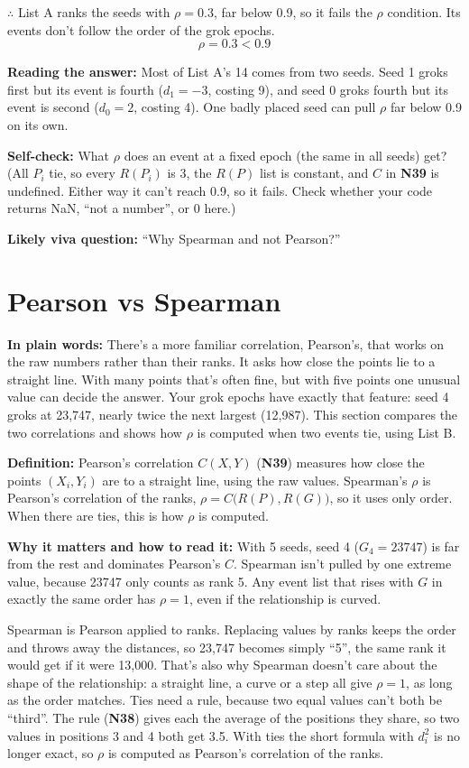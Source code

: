 \documentclass[11pt,a4paper,oneside,openany]{report}
\newcommand{\gl}[1]{\textbf{#1}}   %
\newcommand{\fplain}{\textbf{In plain words:} }
\newcommand{\fdef}{\textbf{Definition:} }
\newcommand{\fread}{\par\textbf{Why it matters and how to read it:} }
\newcommand{\fans}{\par\textbf{Reading the answer:} }
\newcommand{\fself}{\par\textbf{Self-check:} }
\newcommand{\fviva}{\par\textbf{Likely viva question:} }
\begin{document}
$\therefore$ List A ranks the seeds with $\rho = 0.3$, far below 0.9, so it fails the $\rho$ condition. Its events don't follow the order of the grok epochs.
\[\boxed{\rho = 0.3 < 0.9}\]

\fans Most of List A's 14 comes from two seeds. Seed 1 groks first but its event is fourth ($d_1 = -3$, costing 9), and seed 0 groks fourth but its event is second ($d_0 = 2$, costing 4). One badly placed seed can pull $\rho$ far below 0.9 on its own.

\fself What $\rho$ does an event at a fixed epoch (the same in all seeds) get? (All $P_i$ tie, so every $R(P_i)$ is 3, the $R(P)$ list is constant, and $C$ in \gl{N39} is undefined. Either way it can't reach 0.9, so it fails. Check whether your code returns NaN, ``not a number'', or 0 here.)
\fviva ``Why Spearman and not Pearson?''

\section{Pearson vs Spearman}
\fplain There's a more familiar correlation, Pearson's, that works on the raw numbers rather than their ranks. It asks how close the points lie to a straight line. With many points that's often fine, but with five points one unusual value can decide the answer. Your grok epochs have exactly that feature: seed 4 groks at 23{,}747, nearly twice the next largest (12{,}987). This section compares the two correlations and shows how $\rho$ is computed when two events tie, using List B.

\fdef Pearson's correlation $C(X, Y)$ (\gl{N39}) measures how close the points $(X_i, Y_i)$ are to a straight line, using the raw values. Spearman's $\rho$ is Pearson's correlation of the ranks, $\rho = C\big(R(P), R(G)\big)$, so it uses only order. When there are ties, this is how $\rho$ is computed.
\fread With 5 seeds, seed 4 ($G_4 = 23747$) is far from the rest and dominates Pearson's $C$. Spearman isn't pulled by one extreme value, because 23747 only counts as rank 5. Any event list that rises with $G$ in exactly the same order has $\rho = 1$, even if the relationship is curved.

Spearman is Pearson applied to ranks. Replacing values by ranks keeps the order and throws away the distances, so 23{,}747 becomes simply ``5'', the same rank it would get if it were 13{,}000. That's also why Spearman doesn't care about the shape of the relationship: a straight line, a curve or a step all give $\rho = 1$, as long as the order matches. Ties need a rule, because two equal values can't both be ``third''. The rule (\gl{N38}) gives each the average of the positions they share, so two values in positions 3 and 4 both get 3.5. With ties the short formula with $d_i^2$ is no longer exact, so $\rho$ is computed as Pearson's correlation of the ranks.
\end{document}
